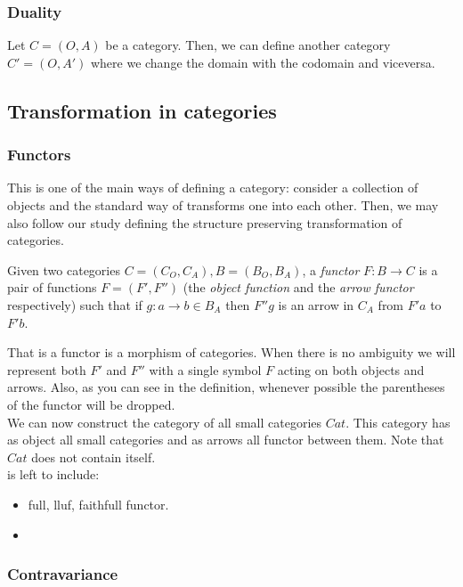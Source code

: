 \subsubsection{Duality}

Let $C = (O,A)$ be a category. Then, we can define another category $C' = (O,A')$ where we change the domain with the codomain and viceversa. 

\subsection{Transformation in categories}




\subsubsection{Functors}
This is one of the main ways of defining a category: consider a collection of objects and the standard way of transforms one into each other. Then, we may also follow our study defining the structure preserving transformation of categories.

\begin{definition}
  Given two categories $C=(C_O, C_A), B=(B_O, B_A)$, a \emph{functor} $F: B \to C$ is a pair of functions $F=(F',F'')$ (the \emph{object function} and the \emph{arrow functor} respectively)  such that if $g:a\to b \in B_A$ then $F''g$ is an arrow in $C_A$ from $F'a$ to $F'b$.

\end{definition}

That is a functor is a morphism of categories. When there is no ambiguity we will represent both $F'$ and $F''$ with a single symbol $F$ acting on both objects and arrows. Also, as you can see in the definition, whenever possible the parentheses of the functor will be dropped.\\

We can now construct the category of all small categories $Cat$. This category has as object all small categories and as arrows all functor between them. Note that $Cat$ does not contain itself.\\


is left to include:
\begin{itemize}
\item full, lluf, faithfull functor.
\item 
\end{itemize}
\subsubsection{Contravariance}


